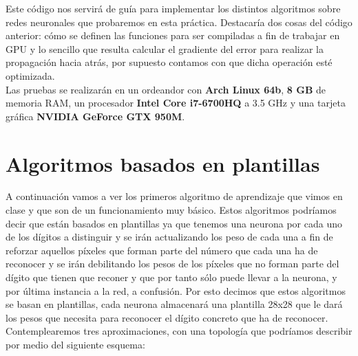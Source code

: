 \documentclass[10pt,a4paper]{article}
\begin{document}
Este código nos servirá de guía para implementar los distintos algoritmos sobre redes neuronales que probaremos en esta práctica. Destacaría dos cosas del código anterior: cómo se definen las funciones para ser compiladas a fin de trabajar en GPU y lo sencillo que resulta calcular el gradiente del error para realizar la propagación hacia atrás, por supuesto contamos con que dicha operación esté optimizada.\\

Las pruebas se realizarán en un ordeandor con \textbf{Arch Linux 64b}, \textbf{8 GB} de memoria RAM, un procesador \textbf{Intel Core i7-6700HQ} a 3.5 GHz y una tarjeta gráfica \textbf{NVIDIA GeForce GTX 950M}.

\section{Algoritmos basados en plantillas}

A continuación vamos a ver los primeros algoritmo de aprendizaje que vimos en clase y que son de un funcionamiento muy básico. Estos algoritmos podríamos decir que están basados en plantillas ya que tenemos una neurona por cada uno de los dígitos a distinguir y se irán actualizando los peso de cada una a fin de reforzar aquellos píxeles que forman parte del número que cada una ha de reconocer y se irán debilitando los pesos de los píxeles que no forman parte del dígito que tienen que reconer y que por tanto sólo puede llevar a la neurona, y por última instancia a la red, a confusión. Por esto decimos que estos algoritmos se basan en plantillas, cada neurona almacenará una plantilla 28x28 que le dará los pesos que necesita para reconocer el dígito concreto que ha de reconocer. Contemplearemos tres aproximaciones, con una topología que podríamos describir por medio del siguiente esquema:
\end{document}
